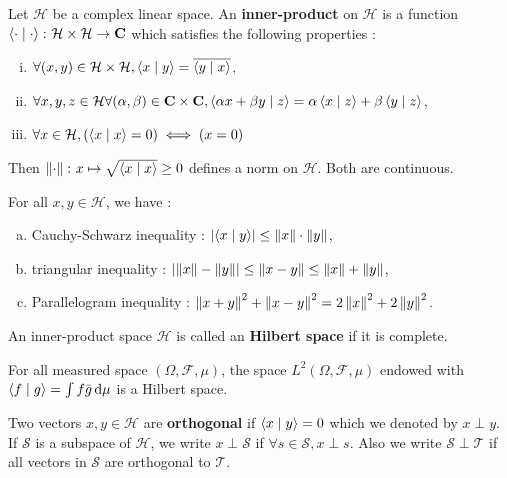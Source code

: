 \begin{defn}
	Let $\mathcal{H}$ be a complex linear space.
	An \textbf{inner-product} on $\mathcal{H}$ is a function $\left\langle \cdot \mid \cdot \right\rangle \colon \mathcal{H} \times \mathcal{H} \to \mathbf{C}$ which satisfies the following properties :
	\begin{enumerate}[(i)]
		\item $\forall (x,y) \in \mathcal{H} \times \mathcal{H}, \left\langle x \mid y \right\rangle = \overline{\left\langle y \mid x \right\rangle}$,
		\item $\forall x, y, z \in \mathcal{H} \forall (\alpha,\beta) \in \mathbf{C} \times \mathbf{C}, \left\langle \alpha x + \beta y \mid z \right\rangle = \alpha \left\langle x \mid z \right\rangle + \beta \left\langle y \mid z \right\rangle$,
		\item $\forall x \in \mathcal{H}, \left( \left\langle x \mid x \right\rangle = 0 \right) \iff \left( x = 0 \right)$
	\end{enumerate}
	Then $\left\lVert\cdot\right\rVert \colon x \mapsto \sqrt{\left\langle x \mid x \right\rangle} \geq 0$ defines a norm on $\mathcal{H}$.
	Both are continuous.
\end{defn}

\begin{thm}
	For all $x, y \in \mathcal{H}$, we have :
	\begin{enumerate}[a)]
		\item Cauchy-Schwarz inequality : $\left\lvert\left\langle x \mid y \right\rangle\right\rvert \leq \left\lVert x\right\rVert \cdot \left\lVert y\right\rVert$,
		\item triangular inequality : $\left\lvert\left\lVert x\right\rVert - \left\lVert y\right\rVert\right\rvert \leq \left\lVert x - y\right\rVert \leq \left\lVert x\right\rVert + \left\lVert y\right\rVert$,
		\item Parallelogram inequality : $\left\lVert x + y\right\rVert^2 + \left\lVert x - y\right\rVert^2 = 2 \left\lVert x\right\rVert^2 + 2 \left\lVert y\right\rVert^2$.
	\end{enumerate}
\end{thm}

\begin{defn}
	An inner-product space $\mathcal{H}$ is called an \textbf{Hilbert space} if it is complete.
\end{defn}

\begin{pop}
	For all measured space $(\Omega, \mathcal{F}, \mu)$, the space $L^2(\Omega, \mathcal{F}, \mu)$ endowed with $\left\langle f \mid g \right\rangle = \int f \bar{g} \mathop{}\mathopen{}\mathrm{d} \mu$ is a Hilbert space.
\end{pop}

\begin{defn}
	Two vectors $x,y \in \mathcal{H}$ are \textbf{orthogonal} if $\left\langle x \mid y \right\rangle = 0$ which we denoted by $x \perp y$.
	If $\mathcal{S}$ is a subspace of $\mathcal{H}$, we write $x \perp \mathcal{S}$ if $\forall s \in \mathcal{S}, x \perp s$.
	Also we write $\mathcal{S} \perp \mathcal{T}$ if all vectors in $\mathcal{S}$ are orthogonal to $\mathcal{T}$.
\end{defn}

